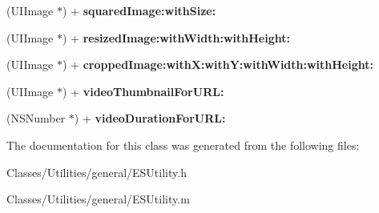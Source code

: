 \begin{DoxyCompactItemize}
\item 
\hypertarget{interface_e_s_utility_a0cf85e8c69d4ade911e0dfe9a2c90c69}{}(U\+I\+Image $\ast$) + {\bfseries squared\+Image\+:with\+Size\+:}\label{interface_e_s_utility_a0cf85e8c69d4ade911e0dfe9a2c90c69}

\item 
\hypertarget{interface_e_s_utility_af870079893cdf0acca93f95ae692e93c}{}(U\+I\+Image $\ast$) + {\bfseries resized\+Image\+:with\+Width\+:with\+Height\+:}\label{interface_e_s_utility_af870079893cdf0acca93f95ae692e93c}

\item 
\hypertarget{interface_e_s_utility_af95463df9a87d5a32ea6b1d37e96ece7}{}(U\+I\+Image $\ast$) + {\bfseries cropped\+Image\+:with\+X\+:with\+Y\+:with\+Width\+:with\+Height\+:}\label{interface_e_s_utility_af95463df9a87d5a32ea6b1d37e96ece7}

\item 
\hypertarget{interface_e_s_utility_affc2e324ef3897797fa208658c589c95}{}(U\+I\+Image $\ast$) + {\bfseries video\+Thumbnail\+For\+U\+R\+L\+:}\label{interface_e_s_utility_affc2e324ef3897797fa208658c589c95}

\item 
\hypertarget{interface_e_s_utility_ae543d6216e1a1827f5ad97e0f875d66d}{}(N\+S\+Number $\ast$) + {\bfseries video\+Duration\+For\+U\+R\+L\+:}\label{interface_e_s_utility_ae543d6216e1a1827f5ad97e0f875d66d}

\end{DoxyCompactItemize}


The documentation for this class was generated from the following files\+:\begin{DoxyCompactItemize}
\item 
Classes/\+Utilities/general/E\+S\+Utility.\+h\item 
Classes/\+Utilities/general/E\+S\+Utility.\+m\end{DoxyCompactItemize}
